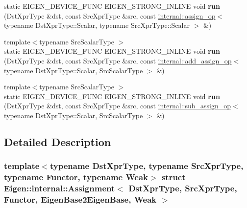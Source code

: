 \begin{DoxyCompactItemize}
static E\+I\+G\+E\+N\+\_\+\+D\+E\+V\+I\+C\+E\+\_\+\+F\+U\+NC E\+I\+G\+E\+N\+\_\+\+S\+T\+R\+O\+N\+G\+\_\+\+I\+N\+L\+I\+NE void {\bfseries run} (Dst\+Xpr\+Type \&dst, const Src\+Xpr\+Type \&src, const \hyperlink{struct_eigen_1_1internal_1_1assign__op}{internal\+::assign\+\_\+op}$<$ typename Dst\+Xpr\+Type\+::\+Scalar, typename Src\+Xpr\+Type\+::\+Scalar $>$ \&)
\item 
\mbox{\label{struct_eigen_1_1internal_1_1_assignment_3_01_dst_xpr_type_00_01_src_xpr_type_00_01_functor_00_018d07b9941c0091b62a0d03d702c7ac1b_a915dbd72d6a3f50505f06554da7af5da}} 
{\footnotesize template$<$typename Src\+Scalar\+Type $>$ }\\static E\+I\+G\+E\+N\+\_\+\+D\+E\+V\+I\+C\+E\+\_\+\+F\+U\+NC E\+I\+G\+E\+N\+\_\+\+S\+T\+R\+O\+N\+G\+\_\+\+I\+N\+L\+I\+NE void {\bfseries run} (Dst\+Xpr\+Type \&dst, const Src\+Xpr\+Type \&src, const \hyperlink{struct_eigen_1_1internal_1_1add__assign__op}{internal\+::add\+\_\+assign\+\_\+op}$<$ typename Dst\+Xpr\+Type\+::\+Scalar, Src\+Scalar\+Type $>$ \&)
\item 
\mbox{\label{struct_eigen_1_1internal_1_1_assignment_3_01_dst_xpr_type_00_01_src_xpr_type_00_01_functor_00_018d07b9941c0091b62a0d03d702c7ac1b_a6d0d55aa4438451b3d517e6f29161c4a}} 
{\footnotesize template$<$typename Src\+Scalar\+Type $>$ }\\static E\+I\+G\+E\+N\+\_\+\+D\+E\+V\+I\+C\+E\+\_\+\+F\+U\+NC E\+I\+G\+E\+N\+\_\+\+S\+T\+R\+O\+N\+G\+\_\+\+I\+N\+L\+I\+NE void {\bfseries run} (Dst\+Xpr\+Type \&dst, const Src\+Xpr\+Type \&src, const \hyperlink{struct_eigen_1_1internal_1_1sub__assign__op}{internal\+::sub\+\_\+assign\+\_\+op}$<$ typename Dst\+Xpr\+Type\+::\+Scalar, Src\+Scalar\+Type $>$ \&)
\end{DoxyCompactItemize}


\subsection{Detailed Description}
\subsubsection*{template$<$typename Dst\+Xpr\+Type, typename Src\+Xpr\+Type, typename Functor, typename Weak$>$\newline
struct Eigen\+::internal\+::\+Assignment$<$ Dst\+Xpr\+Type, Src\+Xpr\+Type, Functor, Eigen\+Base2\+Eigen\+Base, Weak $>$}



